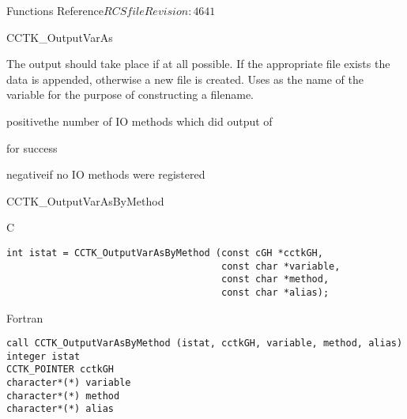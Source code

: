 \begin{cactuspart}{ Functions Reference}{$RCSfile$}{$Revision: 4641 $}
\begin{FunctionDescription}{CCTK\_OutputVarAs}
\begin{Discussion}
The output should take place if at all possible.
If the appropriate file exists the data is appended, otherwise a new
file is created. Uses  as the name of the variable for the purpose
of constructing a filename.
\end{Discussion}

\begin{ErrorSection}
\begin{Error}{positive}the number of IO methods which did output of \end{Error}
\begin{Error}{0}for success\end{Error}
\begin{Error}{negative}if no IO methods were registered\end{Error}
\end{ErrorSection}
\end{FunctionDescription}


\begin{FunctionDescription}{CCTK\_OutputVarAsByMethod}
\label{CCTK-OutputVarAsByMethod}

\begin{SynopsisSection}
\begin{Synopsis}{C}
\begin{verbatim}
int istat = CCTK_OutputVarAsByMethod (const cGH *cctkGH,
                                      const char *variable,
                                      const char *method,
                                      const char *alias);
\end{verbatim}
\end{Synopsis}
\begin{Synopsis}{Fortran}
\begin{verbatim}
call CCTK_OutputVarAsByMethod (istat, cctkGH, variable, method, alias)
integer istat
CCTK_POINTER cctkGH
character*(*) variable
character*(*) method
character*(*) alias
\end{verbatim}
\end{Synopsis}
\end{SynopsisSection}


\end{FunctionDescription}
\end{cactuspart}
